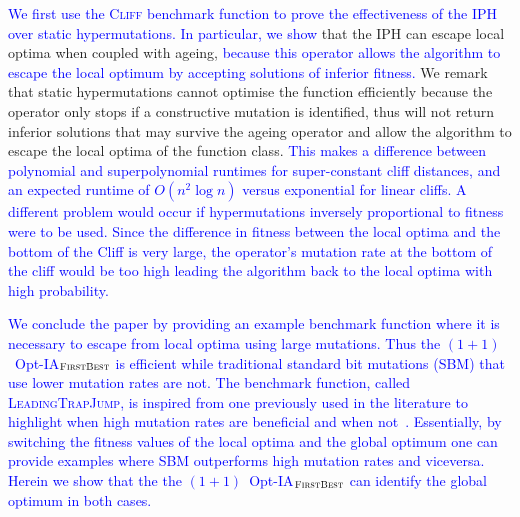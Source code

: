 \documentclass[lettersize,journal]{IEEEtran}
\newcommand{\new}[1]{\textcolor{blue}{#1}}
\begin{document}
\new{We first use the \textsc{Cliff} benchmark function to prove the effectiveness of the IPH over static hypermutations. In particular, we show} 
that the IPH can escape local optima when coupled with ageing, \new{because this operator allows the algorithm to escape the local optimum by accepting solutions of inferior fitness.} We remark that static hypermutations cannot optimise the function efficiently because %
the operator only stops if a constructive mutation is identified, thus will not return inferior solutions that may survive the ageing operator and allow the algorithm to escape the local optima of the function class. \new{This makes a difference between polynomial and superpolynomial runtimes for super-constant cliff distances, and an expected runtime of $O(n^2 \log n)$ versus exponential for linear cliffs. 
A different problem would occur if hypermutations inversely proportional to fitness were to be used. Since the difference in fitness between the local optima and the bottom of the Cliff is very large, the operator's mutation rate at the bottom of the cliff would be too high leading the algorithm back to the local optima with high probability.}

\new{We conclude the paper by providing an example benchmark function where it is necessary to escape from local optima using large mutations. Thus the $(1+1)$~Opt-IA$_{\textsc{FirstBest}}$ is efficient while traditional standard bit mutations (SBM) that use lower mutation rates are not. The benchmark function, called \textsc{LeadingTrapJump}, is inspired from one previously used in the literature to highlight when high mutation rates are beneficial and when not~\cite{OlivetoLehreNeumann09}. Essentially, by switching the fitness values of the local optima and the global optimum one can provide examples where SBM outperforms high mutation rates and viceversa. Herein we show that the the $(1+1)$~Opt-IA$_{\textsc{FirstBest}}$ can identify the global optimum in both cases.}
\end{document}
